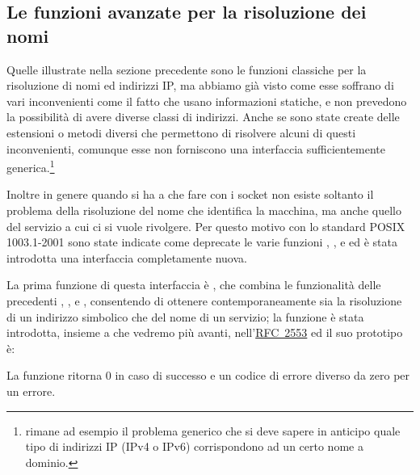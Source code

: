 \subsection{Le funzioni avanzate per la risoluzione dei nomi}
\label{sec:sock_advanced_name_services}

Quelle illustrate nella sezione precedente sono le funzioni classiche per la
risoluzione di nomi ed indirizzi IP, ma abbiamo già visto come esse soffrano
di vari inconvenienti come il fatto che usano informazioni statiche, e non
prevedono la possibilità di avere diverse classi di indirizzi. Anche se sono
state create delle estensioni o metodi diversi che permettono di risolvere
alcuni di questi inconvenienti, comunque esse non forniscono una interfaccia
sufficientemente generica.\footnote{rimane ad esempio il problema generico che
  si deve sapere in anticipo quale tipo di indirizzi IP (IPv4 o IPv6)
  corrispondono ad un certo nome a dominio.}

Inoltre in genere quando si ha a che fare con i socket non esiste soltanto il
problema della risoluzione del nome che identifica la macchina, ma anche
quello del servizio a cui ci si vuole rivolgere.  Per questo motivo con lo
standard POSIX 1003.1-2001 sono state indicate come deprecate le varie
funzioni , ,  e
 ed è stata introdotta una interfaccia completamente
nuova.

La prima funzione di questa interfaccia è , che combina le
funzionalità delle precedenti , ,
 e , consentendo di ottenere
contemporaneamente sia la risoluzione di un indirizzo simbolico che del nome
di un servizio; la funzione è stata introdotta, insieme a 
che vedremo più avanti,
nell'\href{http://www.ietf.org/rfc/rfc2553.txt}{RFC~2553} ed il suo prototipo è:


\begin{funcproto}{
}

{La funzione ritorna $0$ in caso di successo e un codice di errore diverso da
  zero per un errore.}
\end{funcproto}

